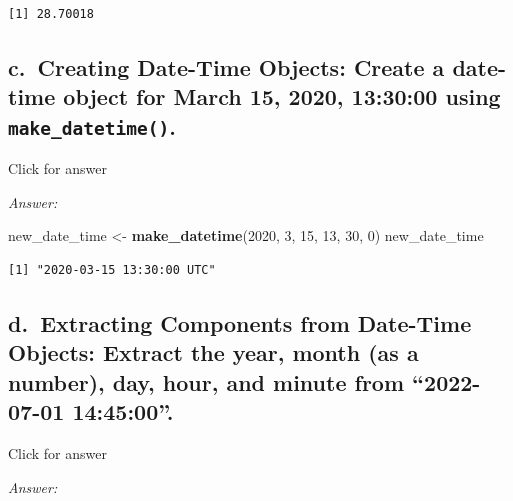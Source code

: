 \documentclass[
]{book}
\newenvironment{Shaded}{\begin{snugshade}}{\end{snugshade}}
\newcommand{\DecValTok}[1]{\textcolor[rgb]{0.00,0.00,0.81}{#1}}
\newcommand{\FunctionTok}[1]{\textcolor[rgb]{0.13,0.29,0.53}{\textbf{#1}}}
\newcommand{\NormalTok}[1]{#1}
\newcommand{\OtherTok}[1]{\textcolor[rgb]{0.56,0.35,0.01}{#1}}
\begin{document}
\begin{verbatim}
[1] 28.70018
\end{verbatim}

\hypertarget{c.-creating-date-time-objects-create-a-date-time-object-for-march-15-2020-133000-using-make_datetime.}{%
\subsection{\texorpdfstring{c.~Creating Date-Time Objects: Create a date-time object for March 15, 2020, 13:30:00 using \texttt{make\_datetime()}.}{c.~Creating Date-Time Objects: Create a date-time object for March 15, 2020, 13:30:00 using make\_datetime().}}\label{c.-creating-date-time-objects-create-a-date-time-object-for-march-15-2020-133000-using-make_datetime.}}

Click for answer

\emph{Answer:}

\begin{Shaded}
\begin{Highlighting}[]
\NormalTok{new\_date\_time }\OtherTok{\textless{}{-}} \FunctionTok{make\_datetime}\NormalTok{(}\DecValTok{2020}\NormalTok{, }\DecValTok{3}\NormalTok{, }\DecValTok{15}\NormalTok{, }\DecValTok{13}\NormalTok{, }\DecValTok{30}\NormalTok{, }\DecValTok{0}\NormalTok{)}
\NormalTok{new\_date\_time}
\end{Highlighting}
\end{Shaded}

\begin{verbatim}
[1] "2020-03-15 13:30:00 UTC"
\end{verbatim}

\hypertarget{d.-extracting-components-from-date-time-objects-extract-the-year-month-as-a-number-day-hour-and-minute-from-2022-07-01-144500.}{%
\subsection{d.~Extracting Components from Date-Time Objects: Extract the year, month (as a number), day, hour, and minute from ``2022-07-01 14:45:00''.}\label{d.-extracting-components-from-date-time-objects-extract-the-year-month-as-a-number-day-hour-and-minute-from-2022-07-01-144500.}}

Click for answer

\emph{Answer:}
\end{document}
